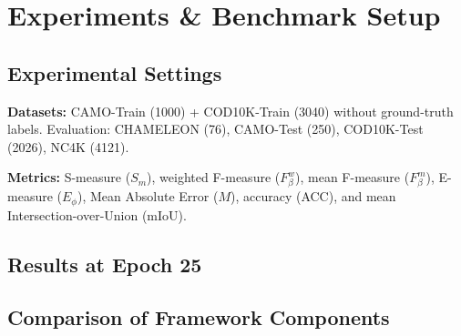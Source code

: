 \documentclass[journal,twoside,web]{IEEEtran}
\newcommand{\methodname}{UCOD-ADF}
\begin{document}
\section{Experiments \& Benchmark Setup}
\label{sec:experiments}

\subsection{Experimental Settings}
\textbf{Datasets:} CAMO-Train (1000) + COD10K-Train (3040) without ground-truth labels. Evaluation: CHAMELEON (76), CAMO-Test (250), COD10K-Test (2026), NC4K (4121).

\textbf{Metrics:} S-measure ($S_m$), weighted F-measure ($F_\beta^w$), mean F-measure ($F_\beta^m$), E-measure ($E_\phi$), Mean Absolute Error ($M$), accuracy (ACC), and mean Intersection-over-Union (mIoU).

\subsection{Results at Epoch 25}

\begin{table}[t]
\centering
\caption{\methodname{} quantitative results across all four test benchmarks, checkpoint at epoch 25.}
\label{tab:epoch25_results}
\end{table}

\subsection{Comparison of Framework Components}
\end{document}
